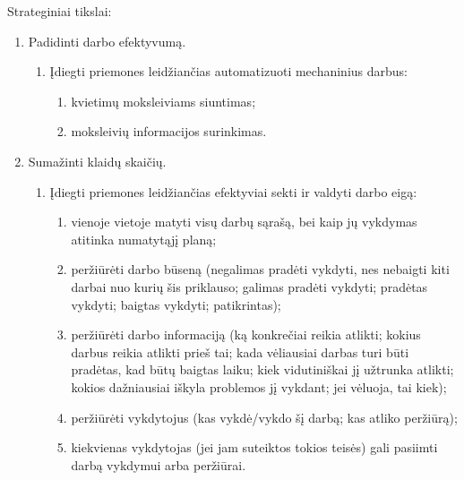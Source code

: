 Strateginiai tikslai:
\begin{enumerate}
  \item \label{tiksl_efek} Padidinti darbo efektyvumą.
    \begin{enumerate}
      \item \label{tiksl_auto} Įdiegti priemones leidžiančias automatizuoti 
        mechaninius darbus:
        \begin{enumerate}
          \item \label{tiksl_el} kvietimų moksleiviams siuntimas;
          \item \label{tiksl_r} moksleivių informacijos surinkimas.
        \end{enumerate}
    \end{enumerate}
  \item \label{tiksl_kl} Sumažinti klaidų skaičių.
    \begin{enumerate}
      \item \label{tiksl_vald} Įdiegti priemones leidžiančias efektyviai 
        sekti ir valdyti darbo eigą:
        \begin{enumerate}
          \item \label{tiksl_dvisk} vienoje vietoje matyti visų darbų 
            sąrašą, bei kaip jų vykdymas atitinka numatytąjį planą;
          \item \label{tiksl_dbus} peržiūrėti darbo būseną (negalimas 
            pradėti vykdyti, nes
            nebaigti kiti darbai nuo kurių šis priklauso; galimas pradėti
            vykdyti; pradėtas vykdyti; baigtas vykdyti; patikrintas);
          \item \label{tiksl_dinfo} peržiūrėti darbo informaciją (ką 
            konkrečiai reikia 
            atlikti; kokius darbus reikia atlikti prieš tai; kada 
            vėliausiai darbas turi būti pradėtas, kad būtų baigtas laiku;
            kiek vidutiniškai jį užtrunka atlikti; kokios dažniausiai 
            iškyla problemos jį vykdant; jei vėluoja, tai kiek);
          \item \label{tiksl_dvyk} peržiūrėti vykdytojus (kas vykdė/vykdo 
            šį darbą; kas atliko peržiūrą);
          \item \label{tiksl_dv} kiekvienas vykdytojas (jei jam suteiktos 
            tokios teisės) gali pasiimti darbą vykdymui arba peržiūrai.
        \end{enumerate}
    \end{enumerate}
\end{enumerate}

